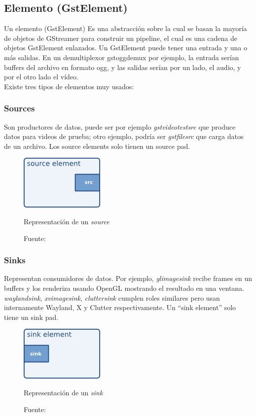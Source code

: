 \documentclass[a4paper,openright,12pt]{report}
\begin{document}
\subsection{Elemento (GstElement)}
Un elemento (GstElement) Es una abstracción sobre la cual se basan la mayoría de
objetos de GStreamer para construir un pipeline, el cual es una cadena de
objetos GstElement enlazados. Un GstElement puede tener una entrada y una o más
salidas. En un demultiplexor gstoggdemux por ejemplo, la entrada serían buffers
del archivo en formato ogg, y las salidas serían por un lado, el audio, y por
el otro lado el vídeo.\\
Existe tres tipos de elementos muy usados:\\
\subsubsection{Sources}
Son productores de datos, puede ser por ejemplo \textit{gstvideotestsrc} que
produce datos para videos de prueba; otro ejemplo, podría ser
\textit{gstfilesrc} que carga datos de un archivo. Los source elements solo
tienen un source pad.

\begin{figure}[h]
  \centering
    \includegraphics{../images/pwg-src-element.png}\par
  \caption{Representación de un \textit{source}}
  \caption*{Fuente: \cite[p.~5]{boulton2017gstreamer}}
\end{figure}

\subsubsection{Sinks}
Representan consumidores de datos. Por ejemplo, \textit{glimagesink} recibe
frames en un buffers y los renderiza usando OpenGL mostrando el resultado en una
ventana. \textit{waylandsink}, \textit{xvimagesink}, \textit{cluttersink}
cumplen roles similares pero usan internamente Wayland, X y Clutter
respectivamente. Un ``sink element'' solo tiene un sink pad.

\begin{figure}[h]
  \centering
    \includegraphics{../images/pwg-sink-element.png}\par
  \caption{Representación de un \textit{sink}}
  \caption*{Fuente: \cite[p.~5]{boulton2017gstreamer}}
\end{figure}
\end{document}
